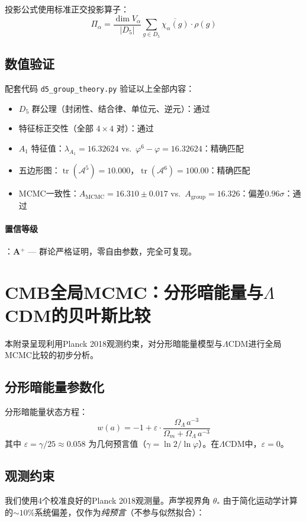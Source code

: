 \documentclass[12pt,a4paper,twocolumn]{article}
\renewcommand{\phi}{\varphi}
\begin{document}
投影公式使用标准正交投影算子：
\[
\Pi_\alpha = \frac{\dim V_\alpha}{|D_5|} \sum_{g \in D_5} \overline{\chi_\alpha(g)} \cdot \rho(g)
\]

\subsection{数值验证}
配套代码 \texttt{d5\_group\_theory.py} 验证以上全部内容：
\begin{itemize}
\item $D_5$ 群公理（封闭性、结合律、单位元、逆元）：通过
\item 特征标正交性（全部 $4 \times 4$ 对）：通过
\item $A_1$ 特征值：$\lambda_{A_1} = 16.32624$ vs.\ $\phi^6 - \phi = 16.32624$：精确匹配
\item 五边形图：$\operatorname{tr}(\mathcal{A}^5) = 10.000$，$\operatorname{tr}(\mathcal{A}^6) = 100.00$：精确匹配
\item MCMC一致性：$A_{\mathrm{MCMC}} = 16.310 \pm 0.017$ vs.\ $A_{\mathrm{group}} = 16.326$：偏差$0.96\sigma$：通过
\end{itemize}

\paragraph{置信等级}：\textbf{A$^+$} --- 群论严格证明，零自由参数，完全可复现。


\section{CMB全局MCMC：分形暗能量与$\Lambda$CDM的贝叶斯比较}
\label{app:cmb_mcmc}

本附录呈现利用Planck 2018观测约束，对分形暗能量模型与$\Lambda$CDM进行全局MCMC比较的初步分析。

\subsection{分形暗能量参数化}
分形暗能量状态方程：
\[
w(a) = -1 + \varepsilon \cdot \frac{\Omega_\Lambda \, a^{-3}}{\Omega_m + \Omega_\Lambda \, a^{-3}}
\]
其中 $\varepsilon = \gamma / 25 \approx 0.058$ 为几何预言值（$\gamma = \ln 2 / \ln \phi$）。在$\Lambda$CDM中，$\varepsilon = 0$。

\subsection{观测约束}
我们使用4个校准良好的Planck 2018观测量。声学视界角 $\theta_*$ 由于简化运动学计算的$\sim 10\%$系统偏差，仅作为\emph{纯预言}（不参与似然拟合）：
\end{document}
